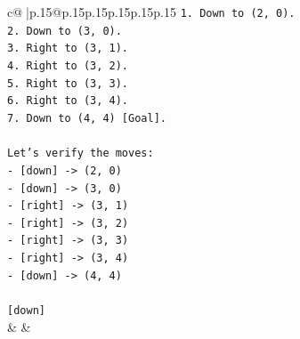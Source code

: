\documentclass{article}
\begin{document}
{\begin{supertabular}{c@{$\;$}|p{.15\linewidth}@{}p{.15\linewidth}p{.15\linewidth}p{.15\linewidth}p{.15\linewidth}p{.15\linewidth}}
{{{\texttt{1. Down to (2, 0).} \\
\texttt{2. Down to (3, 0).} \\
\texttt{3. Right to (3, 1).} \\
\texttt{4. Right to (3, 2).} \\
\texttt{5. Right to (3, 3).} \\
\texttt{6. Right to (3, 4).} \\
\texttt{7. Down to (4, 4) {[}Goal{]}.} \\
\\ 
\texttt{Let's verify the moves:} \\
\texttt{{-} {[}down{]} {-}> (2, 0)} \\
\texttt{{-} {[}down{]} {-}> (3, 0)} \\
\texttt{{-} {[}right{]} {-}> (3, 1)} \\
\texttt{{-} {[}right{]} {-}> (3, 2)} \\
\texttt{{-} {[}right{]} {-}> (3, 3)} \\
\texttt{{-} {[}right{]} {-}> (3, 4)} \\
\texttt{{-} {[}down{]} {-}> (4, 4)} \\
\\ 
\texttt{{[}down{]}} \\
            }
        }
    }
    & & \\ \\


\end{supertabular}}
\end{document}
